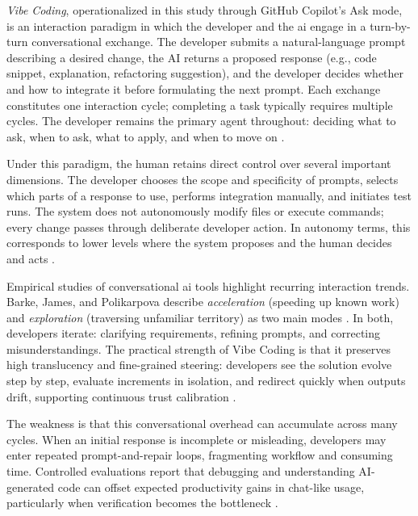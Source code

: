 \emph{Vibe Coding}, operationalized in this study through GitHub Copilot's Ask mode, is an interaction paradigm in which the developer and the \gls{ai} engage in a turn-by-turn conversational exchange. The developer submits a natural-language prompt describing a desired change, the AI returns a proposed response (e.g., code snippet, explanation, refactoring suggestion), and the developer decides whether and how to integrate it before formulating the next prompt. Each exchange constitutes one interaction cycle; completing a task typically requires multiple cycles. The developer remains the primary agent throughout: deciding what to ask, when to ask, what to apply, and when to move on \parencite[pp.~85--88]{barke2023groundedcopilot}.

Under this paradigm, the human retains direct control over several important dimensions. The developer chooses the scope and specificity of prompts, selects which parts of a response to use, performs integration manually, and initiates test runs. The system does not autonomously modify files or execute commands; every change passes through deliberate developer action. In autonomy terms, this corresponds to lower levels where the system proposes and the human decides and acts \parencite[p.~287]{parasuraman2000model}.

Empirical studies of conversational \gls{ai} tools highlight recurring interaction trends. Barke, James, and Polikarpova describe \emph{acceleration} (speeding up known work) and \emph{exploration} (traversing unfamiliar territory) as two main modes \parencite[pp.~89--95]{barke2023groundedcopilot}. In both, developers iterate: clarifying requirements, refining prompts, and correcting misunderstandings. The practical strength of Vibe Coding is that it preserves high translucency and fine-grained steering: developers see the solution evolve step by step, evaluate increments in isolation, and redirect quickly when outputs drift, supporting continuous trust calibration \parencite{leeSee2004trust}.

The weakness is that this conversational overhead can accumulate across many cycles. When an initial response is incomplete or misleading, developers may enter repeated prompt-and-repair loops, fragmenting workflow and consuming time. Controlled evaluations report that debugging and understanding AI-generated code can offset expected productivity gains in chat-like usage, particularly when verification becomes the bottleneck \parencite{vaithilingam2022expectation, mozannar2024reading}.

